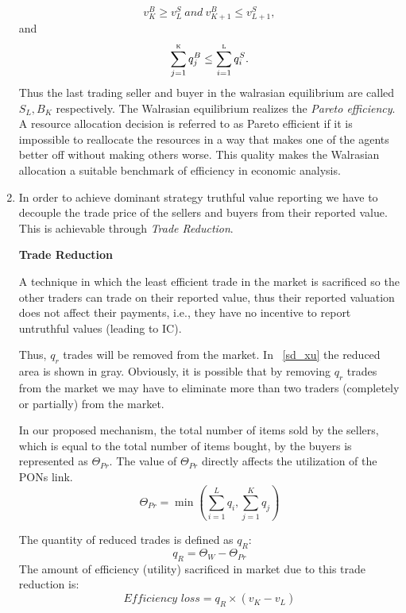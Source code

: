 \begin{enumerate}
\begin{equation}
v^{B}_K\geq v^{S}_L \ \textit{and} \ v^{B}_{K+1} \leq v^{S}_{L+1},
\end{equation}
\vspace{-1mm}
and
\vspace{-1mm}
\begin{equation}
\sum_{j=1}^\textsc{k} q_{j}^B \leq \sum_{i=1}^\textsc{l} q_{i}^S.
\end{equation}
Thus the last trading seller and buyer in the walrasian equilibrium are called $S_L , B_K$ respectively.
The Walrasian equilibrium realizes the \textit{Pareto efficiency}. A resource allocation decision is referred to as Pareto efficient if it is impossible to reallocate the resources in a way that makes one of the agents better off without making others worse. This quality makes the Walrasian allocation a suitable benchmark of efficiency in economic analysis.


\item In order to achieve dominant strategy truthful value reporting we have to decouple the trade price of the sellers and buyers from their reported value. This is achievable through \textit{Trade Reduction}.

\begin{Definition}
\textbf{Trade Reduction}

A technique in which the least efficient trade in the market is sacrificed so the other traders can trade on their reported value, thus their reported valuation does not affect their payments, i.e., they have no incentive to report untruthful values (leading to \ac{IC}).
\end{Definition}
Thus, $q_{r}$ trades will be removed from the market. In \figureautorefname~\ref{sd_xu} the reduced area is shown in gray. Obviously, it is possible that by removing $q_{r}$ trades from the market we may have to eliminate more than two traders (completely or partially) from the market.

In our proposed mechanism, the total number of items sold by the sellers, which is equal to the total number of items bought, by the buyers is represented as $\Theta^{}_{Pr}$. The value of $\Theta^{}_{Pr}$ directly affects the utilization of the \acp{PON} link.
\vspace{-2mm}
\begin{equation}
\Theta^{}_{Pr} = \min (\sum_{i=1}^{L}{q_{i}}, \sum_{j=1}^{K}{q_{j}})
\end{equation}

The quantity of reduced trades is defined as $q^{}_R$:
\begin{equation}
q^{}_R = \Theta^{}_W - \Theta^{}_{Pr}
\end{equation}
The amount of efficiency (utility) sacrificed in market due to this trade reduction is:
\begin{equation}
\textit{Efficiency loss} = q^{}_R \times (v^{}_K-v^{}_L)
\end{equation}


\end{enumerate}
